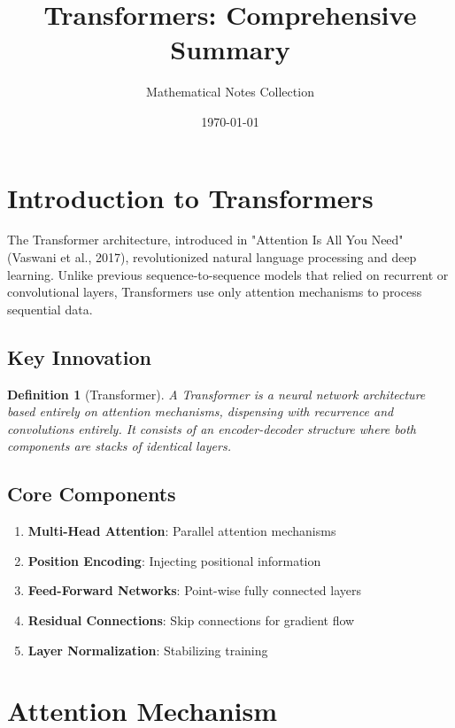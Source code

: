 \documentclass[11pt,a4paper]{article}
\title{Transformers: Comprehensive Summary}
\author{Mathematical Notes Collection}
\date{\today}
\newtheorem{definition}[theorem]{Definition}
\begin{document}
\maketitle
\tableofcontents
\newpage

\section{Introduction to Transformers}

The Transformer architecture, introduced in "Attention Is All You Need" (Vaswani et al., 2017), revolutionized natural language processing and deep learning. Unlike previous sequence-to-sequence models that relied on recurrent or convolutional layers, Transformers use only attention mechanisms to process sequential data.

\subsection{Key Innovation}

\begin{definition}[Transformer]
A Transformer is a neural network architecture based entirely on attention mechanisms, dispensing with recurrence and convolutions entirely. It consists of an encoder-decoder structure where both components are stacks of identical layers.
\end{definition}

\subsection{Core Components}

\begin{enumerate}
\item \textbf{Multi-Head Attention}: Parallel attention mechanisms
\item \textbf{Position Encoding}: Injecting positional information
\item \textbf{Feed-Forward Networks}: Point-wise fully connected layers
\item \textbf{Residual Connections}: Skip connections for gradient flow
\item \textbf{Layer Normalization}: Stabilizing training
\end{enumerate}

\section{Attention Mechanism}
\end{document}
